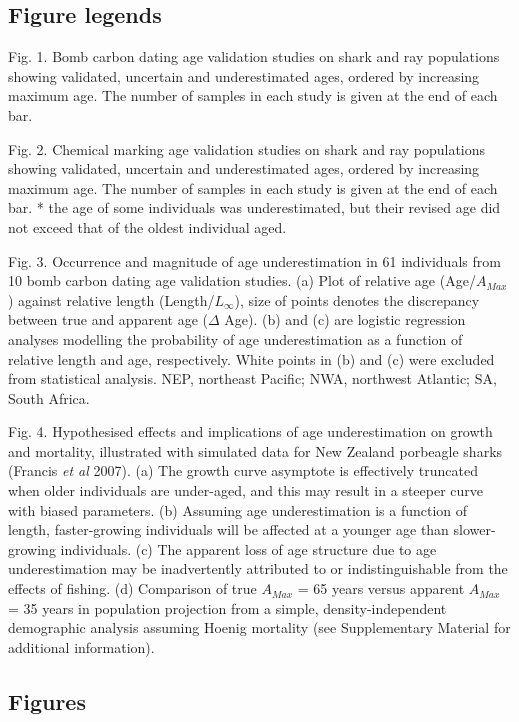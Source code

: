 \documentclass[]{article}
\title{}
\author{}
\date{}
\begin{document}
\linenumbers[787]

\subsection{Figure legends}\label{figure-legends}

Fig. 1. Bomb carbon dating age validation studies on shark and ray
populations showing validated, uncertain and underestimated ages,
ordered by increasing maximum age. The number of samples in each study
is given at the end of each bar.

Fig. 2. Chemical marking age validation studies on shark and ray
populations showing validated, uncertain and underestimated ages,
ordered by increasing maximum age. The number of samples in each study
is given at the end of each bar. * the age of some individuals was
underestimated, but their revised age did not exceed that of the oldest
individual aged.

Fig. 3. Occurrence and magnitude of age underestimation in 61
individuals from 10 bomb carbon dating age validation studies. (a) Plot
of relative age (Age/\(A_{Max}\)) against relative length
(Length/\(L_\infty\)), size of points denotes the discrepancy between
true and apparent age (\(\Delta\) Age). (b) and (c) are logistic
regression analyses modelling the probability of age underestimation as
a function of relative length and age, respectively. White points in (b)
and (c) were excluded from statistical analysis. NEP, northeast Pacific;
NWA, northwest Atlantic; SA, South Africa.

Fig. 4. Hypothesised effects and implications of age underestimation on
growth and mortality, illustrated with simulated data for New Zealand
porbeagle sharks (Francis \emph{et al} 2007). (a) The growth curve
asymptote is effectively truncated when older individuals are
under-aged, and this may result in a steeper curve with biased
parameters. (b) Assuming age underestimation is a function of length,
faster-growing individuals will be affected at a younger age than
slower-growing individuals. (c) The apparent loss of age structure due
to age underestimation may be inadvertently attributed to or
indistinguishable from the effects of fishing. (d) Comparison of true
\(A_{Max}\) = 65 years versus apparent \(A_{Max}\) = 35 years in
population projection from a simple, density-independent demographic
analysis assuming Hoenig mortality (see Supplementary Material for
additional information). \newpage

\subsection{Figures}\label{figures}
\end{document}
